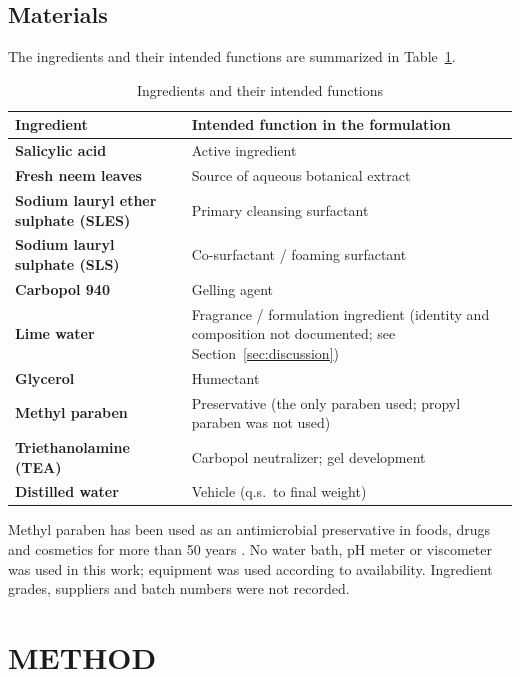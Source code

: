 \documentclass[10pt,a4paper,twocolumn]{article}
\begin{document}
\subsection*{Materials}
The ingredients and their intended functions are summarized in Table~\ref{tab:ingredients}.

\begin{table}[!htbp]
\centering

\renewcommand{\arraystretch}{1.35}
\begin{tabularx}{\textwidth}{>{\bfseries}lX}
\toprule
Ingredient & Intended function in the formulation \\
\midrule
Salicylic acid & Active ingredient \\
Fresh neem leaves & Source of aqueous botanical extract \\
Sodium lauryl ether sulphate (SLES) & Primary cleansing surfactant \\
Sodium lauryl sulphate (SLS) & Co-surfactant / foaming surfactant \\
Carbopol 940 & Gelling agent \\
Lime water & Fragrance / formulation ingredient (identity and composition
             not documented; see Section~\ref{sec:discussion}) \\
Glycerol & Humectant \\
Methyl paraben & Preservative (the only paraben used; propyl paraben was
                 not used) \\
Triethanolamine (TEA) & Carbopol neutralizer; gel development \\
Distilled water & Vehicle (q.s.\ to final weight) \\
\bottomrule
\end{tabularx}
\caption{Ingredients and their intended functions}
\label{tab:ingredients}
\end{table}

Methyl paraben has been used as an antimicrobial preservative in foods,
drugs and cosmetics for more than 50 years \citep{soni2002}. No water
bath, pH meter or viscometer was used in this work; equipment was used
according to availability. Ingredient grades, suppliers and batch numbers
were not recorded.

\section{METHOD}
\end{document}
